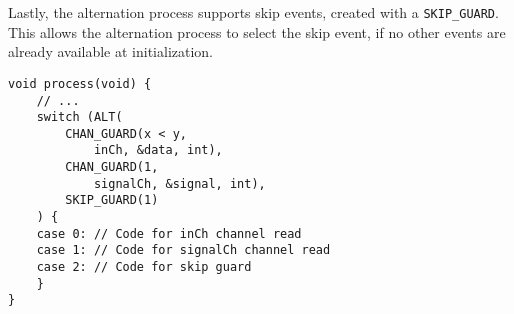 Lastly, the alternation process supports skip events, created with a \texttt{SKIP\_GUARD}. This allows the alternation process to select the skip event, if no other events are already available at initialization. 

\noindent\begin{minipage}{\textwidth}
\begin{lstlisting}[style={CustomC},caption={Alternation construct with skip}]
void process(void) {
    // ...
    switch (ALT(
        CHAN_GUARD(x < y, 
            inCh, &data, int),
        CHAN_GUARD(1, 
            signalCh, &signal, int),
        SKIP_GUARD(1)
    ) {
    case 0: // Code for inCh channel read 
    case 1: // Code for signalCh channel read
    case 2: // Code for skip guard
    }
}
\end{lstlisting}
\end{minipage}

